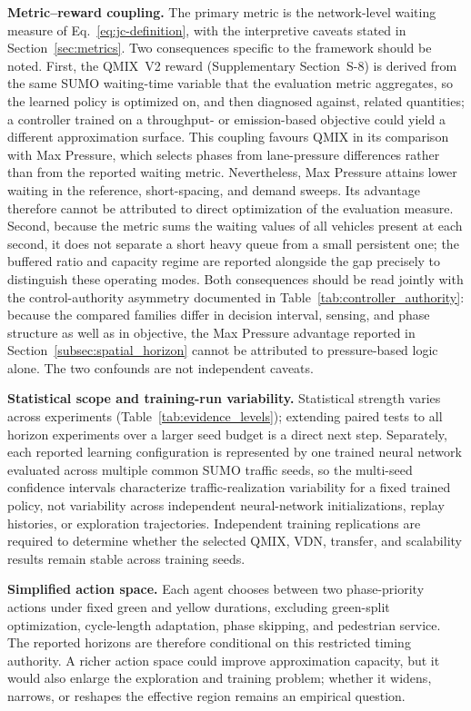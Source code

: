 \documentclass[review,12pt]{elsarticle}
\begin{document}
\textbf{Metric--reward coupling.} The primary metric is the network-level
waiting measure of Eq.~\eqref{eq:jc-definition}, with the interpretive
caveats stated in Section~\ref{sec:metrics}. Two consequences specific to
the framework should be noted. First, the QMIX~V2 reward (Supplementary
Section~S-8) is derived from the same SUMO waiting-time variable that the
evaluation metric aggregates, so the learned policy is optimized on, and
then diagnosed against, related quantities; a controller trained on a
throughput- or emission-based objective could yield a different
approximation surface. This coupling favours QMIX in its comparison with Max Pressure, which selects phases from lane-pressure differences rather than from the reported waiting metric. Nevertheless, Max Pressure attains lower waiting in the reference, short-spacing, and demand sweeps. Its advantage therefore cannot be attributed to direct optimization of the evaluation measure. Second, because the metric sums the waiting values
of all vehicles present at each second, it does not separate a short heavy
queue from a small persistent one; the buffered ratio and capacity regime
are reported alongside the gap precisely to distinguish these operating modes.
Both consequences should be read jointly with the control-authority asymmetry
documented in Table~\ref{tab:controller_authority}: because the compared
families differ in decision interval, sensing, and phase structure as well as
in objective, the Max Pressure advantage reported in
Section~\ref{subsec:spatial_horizon} cannot be attributed to pressure-based
logic alone. The two confounds are not independent caveats.

\textbf{Statistical scope and training-run variability.} Statistical strength varies across experiments (Table~\ref{tab:evidence_levels}); extending paired tests to all horizon experiments over a larger seed budget is a direct next step. Separately, each reported learning configuration is represented by one trained neural network evaluated across multiple common SUMO traffic seeds, so the multi-seed confidence intervals characterize traffic-realization variability for a fixed trained policy, not variability across independent neural-network initializations, replay histories, or exploration trajectories. Independent training replications are required to determine whether the selected QMIX, VDN, transfer, and scalability results remain stable across training seeds.

\textbf{Simplified action space.} Each agent chooses between two phase-priority actions under fixed green and yellow durations, excluding green-split optimization, cycle-length adaptation, phase skipping, and pedestrian service. The reported horizons are therefore conditional on this restricted timing authority. A richer action space could improve approximation capacity, but it would also enlarge the exploration and training problem; whether it widens, narrows, or reshapes the effective region remains an empirical question.
\end{document}
